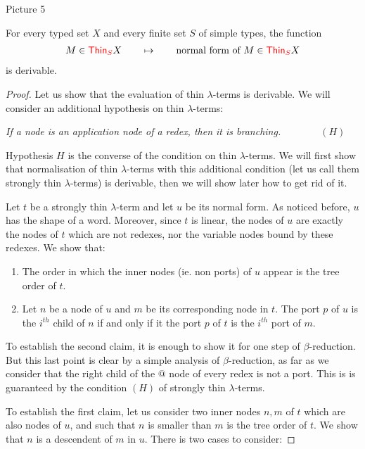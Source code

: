 \begin{center}
Picture 5
\end{center}

\begin{proposition}\label{prop:EvaluateThin}
 For every typed set $X$ and every finite set $S$ of simple types, the function 
    \begin{align*}
        M \in  {\color{red}{\mathsf{Thin}_{S}}} X \qquad \mapsto \qquad \text{normal form of $M$} \in  {\color{red}{\mathsf{Thin}_{S}}} X
    \end{align*}
    is derivable.
\end{proposition}

\begin{proof}
Let us show that the evaluation of thin $\lambda$-terms is derivable. We will consider an additional hypothesis on thin $\lambda$-terms:
\begin{center}
\textit{If a node is an application node of a redex, then it is branching.}$\qquad\qquad (H)$
\end{center}
Hypothesis $H$ is the converse of the condition on thin $\lambda$-terms. We will first show that normalisation of thin $\lambda$-terms with this additional condition (let us call them strongly thin $\lambda$-terms) is derivable, then we will show later how to get rid of it.

Let $t$ be a strongly thin $\lambda$-term and let $u$ be its normal form. As noticed before, $u$ has the shape of a word. Moreover, since $t$ is linear, the nodes of $u$ are exactly the nodes of $t$ which are not redexes, nor the variable nodes bound by these redexes. We show that:
\noindent \begin{enumerate}
\item The order in which the inner nodes (ie. non ports) of $u$ appear is the tree order of $t$.
\item Let $n$ be a node of $u$ and $m$ be its corresponding node in $t$. The port $p$ of $u$ is the $i^{th}$ child of $n$ if and only if it the port $p$ of $t$ is the $i^{th}$ port of $m$.  
\end{enumerate} 

To establish the second claim, it is enough to show it for one step of $\beta$-reduction. But this last point is clear by a simple analysis of $\beta$-reduction, as far as we consider that the right child of the $\text{@}$ node of every redex is not a port. This is is guaranteed by the condition $(H)$ of strongly thin $\lambda$-terms. 

To establish the first claim, let us consider two inner nodes $n, m$ of $t$ which are also nodes of $u$, and such that $n$ is smaller than $m$ is the tree order of $t$. We show that $n$ is a descendent of $m$ in $u$. There is two cases to consider:


\end{proof}
